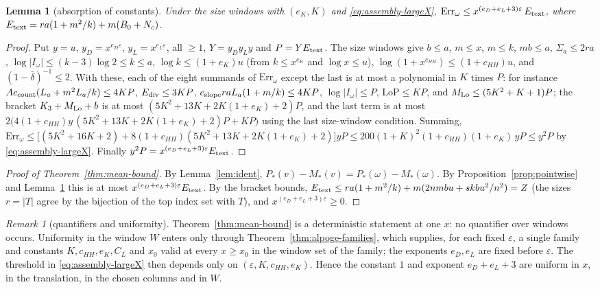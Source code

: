 \documentclass[10pt]{amsart}
\newtheorem{lemma}[theorem]{Lemma}
\theoremstyle{definition}
\theoremstyle{remark}
\newtheorem{remark}[theorem]{Remark}
\begin{document}
\begin{lemma}[absorption of constants]\label{lem:absorb}
Under the size windows with $(e_K,K)$ and \eqref{eq:assembly-largeX},
$\mathrm{Err}_\omega\le x^{(e_D+e_L+3)\varepsilon}\,E_{\rm text}$, where
$E_{\rm text}=ra(1+m^2/k)+m(B_0+N_c)$.
\end{lemma}
\begin{proof}
Put $y=u$, $y_D=x^{e_D\varepsilon}$, $y_L=x^{e_L\varepsilon}$, all $\ge1$, $Y=y_Dy_Ly$
and $P=Y E_{\rm text}$. The size windows give $b\le a$, $m\le x$, $m\le k$,
$mb\le a$, $\Sigma_a\le2ra$, $\log|I_\omega|\le(k-3)\log2\le k\le a$,
$\log k\le(1+e_K)u$ (from $k\le x^{e_K}$ and $\log x\le u$),
$\log(1+x^{c_{HH}})\le(1+c_{HH})u$, and $(1-\bar\delta)^{-1}\le2$. With these,
each of the eight summands of $\mathrm{Err}_\omega$ except the last is at most
a polynomial in $K$ times $P$: for instance
$Ac_{\rm count}(L_a+m^2L_a/k)\le 4KP$, $E_{\rm div}\le3KP$,
$c_{\rm slope}raL_a(1+m/k)\le4KP$, $\log|I_\omega|\le P$, $\mathrm{LoP}\le KP$, and
$M_{\rm Lo}\le(5K^2+K+1)P$; the bracket $K_3+M_{\rm Lo}+b$ is at most
$(5K^2+13K+2K(1+e_K)+2)P$, and the last term is at most
$2\bigl(4(1+c_{HH})y\,(5K^2+13K+2K(1+e_K)+2)P+KP\bigr)$ using the last size-window
condition. Summing, $\mathrm{Err}_\omega\le\bigl[(5K^2+16K+2)+8(1+c_{HH})(5K^2+13K+2K(1+e_K)+2)\bigr]yP
\le200(1+K)^2(1+c_{HH})(1+e_K)\,yP\le y^2P$ by \eqref{eq:assembly-largeX}.
Finally $y^2P=x^{(e_D+e_L+3)\varepsilon}E_{\rm text}$.
\end{proof}

\begin{proof}[Proof of Theorem~\ref{thm:mean-bound}]
By Lemma~\ref{lem:ident}, $P_*(v)-M_*(v)=P_*(\omega)-M_*(\omega)$. By
Proposition~\ref{prop:pointwise} and Lemma~\ref{lem:absorb} this is at most
$x^{(e_D+e_L+3)\varepsilon}E_{\rm text}$. By the bracket bounds,
$E_{\rm text}\le ra(1+m^2/k)+m(2nmbu+skbu^2/n^2)=Z$ (the sizes $r=|T|$ agree by
the bijection of the top index set with $T$), and $x^{(e_D+e_L+3)\varepsilon}\ge0$.
\end{proof}

\begin{remark}[quantifiers and uniformity]\label{rem:mean-uniform}
Theorem~\ref{thm:mean-bound} is a deterministic statement at one $x$: no
quantifier over windows occurs. Uniformity in the window $W$ enters only
through Theorem~\ref{thm:alpoge-families}, which supplies, for each fixed $\varepsilon$, a single
family and constants $K,c_{HH},e_K,C_L$ and $x_0$ valid at every $x\ge x_0$ in
the window set of the family; the exponents $e_D,e_L$ are fixed before
$\varepsilon$. The threshold in \eqref{eq:assembly-largeX} then depends only on
$(\varepsilon,K,c_{HH},e_K)$.
Hence the constant $1$ and exponent $e_D+e_L+3$ are uniform in $x$, in the
translation, in the chosen columns and in $W$.
\end{remark}
\end{document}
